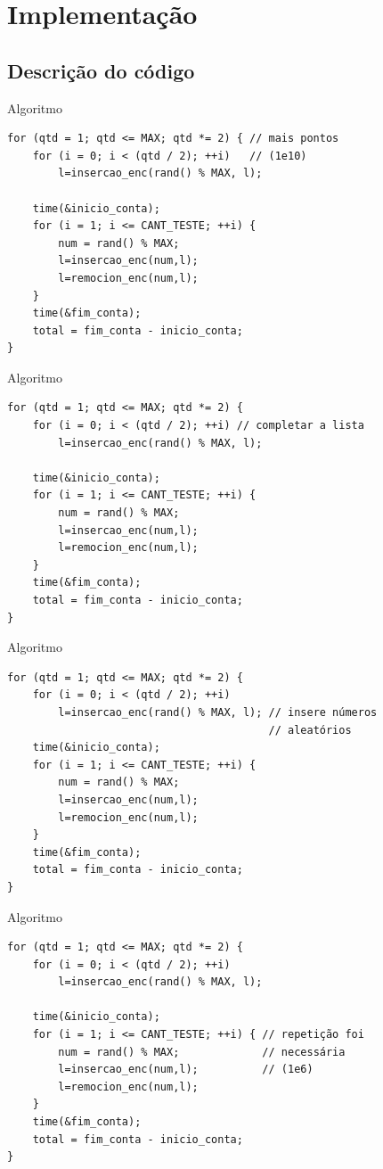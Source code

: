 \documentclass[bigger]{beamer}
\begin{document}
\section{Implementação}
\label{sec-2}
\subsection{Descrição do código}
\label{sec-2-1}
\begin{frame}[fragile,label=sec-2-1-1]{Algoritmo}
 \begin{verbatim}
for (qtd = 1; qtd <= MAX; qtd *= 2) { // mais pontos
    for (i = 0; i < (qtd / 2); ++i)   // (1e10)
        l=insercao_enc(rand() % MAX, l);

    time(&inicio_conta);
    for (i = 1; i <= CANT_TESTE; ++i) {
        num = rand() % MAX;
        l=insercao_enc(num,l);
        l=remocion_enc(num,l);
    }
    time(&fim_conta);
    total = fim_conta - inicio_conta;
}
\end{verbatim}
\end{frame}
\begin{frame}[fragile,label=sec-2-1-2]{Algoritmo}
 \begin{verbatim}
for (qtd = 1; qtd <= MAX; qtd *= 2) {    
    for (i = 0; i < (qtd / 2); ++i) // completar a lista
        l=insercao_enc(rand() % MAX, l);

    time(&inicio_conta);
    for (i = 1; i <= CANT_TESTE; ++i) {
        num = rand() % MAX;
        l=insercao_enc(num,l);
        l=remocion_enc(num,l);
    }
    time(&fim_conta);
    total = fim_conta - inicio_conta;
}
\end{verbatim}
\end{frame}
\begin{frame}[fragile,label=sec-2-1-3]{Algoritmo}
 \begin{verbatim}
for (qtd = 1; qtd <= MAX; qtd *= 2) {    
    for (i = 0; i < (qtd / 2); ++i)      
        l=insercao_enc(rand() % MAX, l); // insere números
                                         // aleatórios
    time(&inicio_conta);
    for (i = 1; i <= CANT_TESTE; ++i) {
        num = rand() % MAX;
        l=insercao_enc(num,l);
        l=remocion_enc(num,l);
    }
    time(&fim_conta);
    total = fim_conta - inicio_conta;
}
\end{verbatim}
\end{frame}
\begin{frame}[fragile,label=sec-2-1-4]{Algoritmo}
 \begin{verbatim}
for (qtd = 1; qtd <= MAX; qtd *= 2) {
    for (i = 0; i < (qtd / 2); ++i)      
        l=insercao_enc(rand() % MAX, l); 

    time(&inicio_conta);
    for (i = 1; i <= CANT_TESTE; ++i) { // repetição foi
        num = rand() % MAX;             // necessária
        l=insercao_enc(num,l);          // (1e6)
        l=remocion_enc(num,l);
    }
    time(&fim_conta);
    total = fim_conta - inicio_conta;
}
\end{verbatim}
\end{frame}
\end{document}
